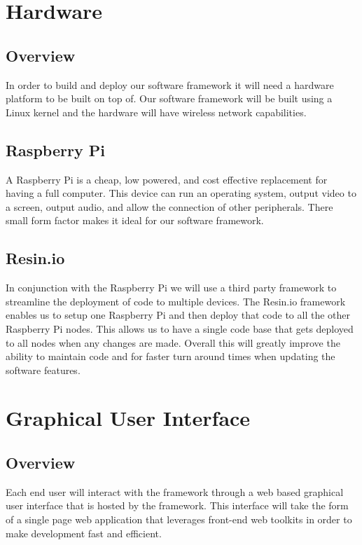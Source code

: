 \documentclass[draftclsnofoot, onecolumn, compsoc, 10pt]{IEEEtran}
\begin{document}
\section{Hardware}
\subsection{Overview} 
In order to build and deploy our software framework it will need a hardware platform to be built on top of. Our software framework will be built using a Linux kernel and the hardware will have wireless network capabilities. 

\subsection{Raspberry Pi}
A Raspberry Pi is a cheap, low powered, and cost effective replacement for having a full computer. This device can run an operating system, output video to a screen, output audio, and allow the connection of other peripherals. There small form factor makes it ideal for our software framework.

\subsection{Resin.io}
In conjunction with the Raspberry Pi we will use a third party framework to streamline the deployment of code to multiple devices. The Resin.io framework enables us to setup one Raspberry Pi and then deploy that code to all the other Raspberry Pi nodes. This allows us to have a single code base that gets deployed to all nodes when any changes are made. Overall this will greatly improve the ability to maintain code and for faster turn around times when updating the software features.




\section{Graphical User Interface}
\subsection{Overview}
Each end user will interact with the framework through a web based graphical user interface that is hosted by the framework. This interface will take the form of a single page web application that leverages front-end web toolkits in order to make development fast and efficient.
\end{document}
